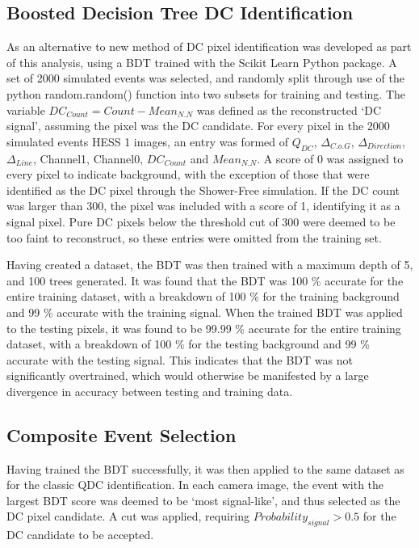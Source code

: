 \documentclass{article}
\begin{document}
\subsection{Boosted Decision Tree DC Identification}  As an alternative to  new method of DC pixel identification was developed as part of this analysis, using a BDT trained with the Scikit Learn Python package. A set of 2000 simulated events was selected, and randomly split through use of the python random.random() function into two subsets for training and testing. The variable $DC_{Count} = Count-Mean_{N.N}$ was defined as the reconstructed \textquoteleft DC signal', assuming the pixel was the DC candidate. For every pixel in the 2000 simulated events HESS 1 images, an entry was formed of $Q_{DC}$, $ \Delta_{C.o.G}$, $\Delta_{Direction}$, $\Delta_{Line}$, Channel1, Channel0, $DC_{Count}$ and $Mean_{N.N}$. A score of 0 was assigned to every pixel to indicate background, with the exception of those that were identified as the DC pixel through the Shower-Free simulation. If the DC count was larger than 300, the pixel was included with a score of 1, identifying it as a signal pixel. Pure DC pixels below the threshold cut of 300 were deemed to be too faint to reconstruct, so these entries were omitted from the training set.

Having created a dataset, the BDT was then trained with a maximum depth of 5, and 100 trees generated. It was found that the BDT was 100 \% accurate for the entire training dataset, with a breakdown of 100 \% for the training background and 99 \% accurate with the training signal. When the trained BDT was applied to the testing pixels, it was found to be 99.99 \%  accurate for the entire training dataset, with a breakdown of 100 \% for the testing background and 99 \% accurate with the testing signal. This indicates that the BDT was not significantly overtrained, which would otherwise be manifested by a large divergence in accuracy between testing and training data.

\subsection{Composite Event Selection}
Having trained the BDT successfully, it was then applied to the same dataset as for the classic QDC identification. In each camera image, the event with the largest BDT score was deemed to be \textquoteleft most signal-like', and thus selected as the DC pixel candidate. A cut was applied, requiring $Probability_{signal} > 0.5$ for the DC candidate to be accepted. 
\end{document}
